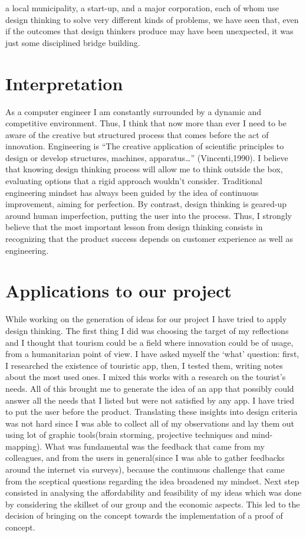 \documentclass[a4paper,9pt]{article}
\begin{document}
a local municipality, a start-up, and a major corporation, each of whom use design thinking to solve very different kinds of problems, we have seen that, even if the outcomes that design thinkers produce may have been unexpected, it was just some disciplined bridge building.

\section{Interpretation}
As a computer engineer I am constantly surrounded by a dynamic and competitive environment. Thus, I think that now more than ever I need to be aware of the creative but structured process that comes before the act of innovation. Engineering is “The creative application of scientific principles to design or develop structures, machines, apparatus…” (Vincenti,1990). I believe that knowing design thinking process will allow me to think outside the box, evaluating options that a rigid approach wouldn’t consider. Traditional engineering mindset has always been guided by the idea of  continuous improvement, aiming for perfection. By contrast, design thinking is geared-up around human imperfection, putting the user into the process. Thus, I strongly believe that the most important lesson from design thinking consists in recognizing that the product success depends on customer experience as well as engineering.

\section{Applications to our project}
While working on the generation of ideas for our project I have tried to apply design thinking. The first thing I did was choosing the target of my reflections and I thought that tourism could be a field where innovation could be of usage, from a humanitarian point of view. I have asked myself the ‘what’ question: first, I researched the existence of touristic app, then, I tested them, writing notes about the most used ones. I mixed this works with a research on the tourist’s needs. All of this brought me to generate the idea of an app that possibly could answer all the needs that I listed but were not satisfied by any app. I have tried to put the user before the product. Translating these insights into design criteria was not hard since I was able to collect all of my observations and lay them out using lot of graphic tools(brain storming, projective techniques and mind-mapping). What was fundamental was the feedback that came from my colleagues, and from the users in general(since I was able to gather feedbacks around the internet via surveys), because the continuous challenge that came from the sceptical questions regarding the idea broadened my mindset. Next step consisted in analysing the affordability and feasibility of my ideas which was done by considering the skillset of our group and the economic aspects. This led to the decision of bringing on the concept towards the implementation of a proof of concept.
\end{document}
